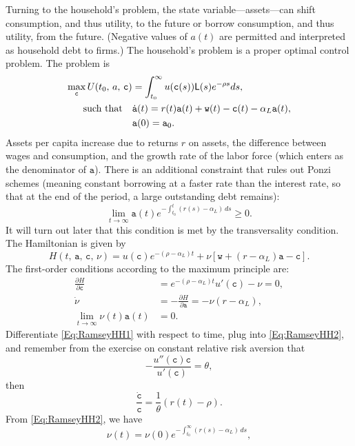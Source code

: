 \documentclass[10pt]{article}
\begin{document}
Turning to the household's problem, the state variable---assets---can shift consumption, and thus utility, to the future or borrow consumption, and thus utility, from the future. (Negative values of $a(t)$ are permitted and interpreted as household debt to firms.)  The household's problem is a proper optimal control problem. The problem is
\begin{align*}
\max_{\mathtt{c}} U(t_0,\, a,\, \mathtt{c}) &= \int_{t_0}^\infty u(\mathtt{c}(s)) \mathsf{L}(s) e^{-\rho s} ds,\\
\mbox{\rm such that} \quad &\dot{\mathtt{a}}(t) = r(t)\mathtt{a}(t) + \mathtt{w}(t) - \mathtt{c}(t) -\alpha_L \mathtt{a}(t),\\
 & \mathtt{a}(0) = \mathtt{a}_0.
\end{align*}
Assets per capita increase due to returns $r$ on assets, the difference between wages and consumption, and the growth rate of the labor force (which enters as the denominator of $\mathtt{a}$).  There is an additional constraint that rules out Ponzi schemes (meaning constant borrowing at a faster rate than the interest rate, so that at the end of the period, a large outstanding debt remains):
\[
\lim_{t\to\infty} \mathtt{a}(t) e^{-\int_{t_0}^t (r(s)-\alpha_L)\, ds} \ge 0.
\]
It will turn out later that this condition is met by the transversality condition.  The Hamiltonian is given by
\[
H(t,\, \mathtt{a},\, \mathtt{c},\, \nu) = u(\mathtt{c}) e^{-(\rho-\alpha_L)t} + \nu \left[ \mathtt{w} + (r-\alpha_L)\mathtt{a} - \mathtt{c} \right].
\]
The first-order conditions according to the maximum principle are:
\begin{align}
\frac{\partial H}{\partial \mathtt{c}} &= e^{-(\rho-\alpha_L)t} u'(\mathtt{c}) - \nu = 0,\label{Eq:RamseyHH1}\\
\dot{\nu} &= -\frac{\partial H}{\partial\mathtt{a}} = -\nu(r-\alpha_L),\label{Eq:RamseyHH2}\\
\lim_{t\to\infty}  \nu(t)\mathtt{a}(t) &= 0.\label{Eq:RamseyHH3}
\end{align}
Differentiate \eqref{Eq:RamseyHH1} with respect to time, plug into \eqref{Eq:RamseyHH2}, and remember from the exercise on constant relative risk aversion that
\[
-\frac{u''(\mathtt{c}) \mathtt{c}}{u'(\mathtt{c})} = \theta,
\]
then
\begin{equation}\label{Eq:RamseyHH4}
\frac{\dot{\mathtt{c}}}{\mathtt{c}} = \frac{1}{\theta}(r(t)-\rho).
\end{equation}
From \eqref{Eq:RamseyHH2}, we have
\[
\nu(t) = \nu(0) e^{-\int_{t_0}^\infty (r(s)-\alpha_L)\, ds},
\]
\end{document}
